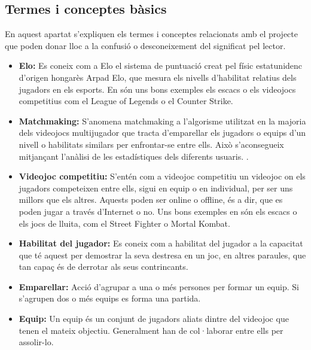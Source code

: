 \documentclass[a4paper]{article}
\begin{document}
\subsection{Termes i conceptes bàsics}
En aquest apartat s'expliquen els termes i conceptes relacionats amb el projecte que poden donar lloc a la confusió o desconeixement del significat pel lector.

\begin{itemize}
\item \textbf{Elo:} Es coneix com a Elo el sistema de puntuació creat pel físic estatunidenc d'origen hongarès Arpad Elo, que mesura els nivells d'habilitat relatius dels jugadors en els esports. En són uns bons exemples els escacs o els videojocs competitius com el League of Legends o el Counter Strike. \cite{wikipediaElo}

\item \textbf{Matchmaking:} S'anomena matchmaking a l'algorisme utilitzat en la majoria dels videojocs multijugador que tracta d'emparellar els jugadors o equips d'un nivell o habilitats similars per enfrontar-se entre ells. Això s'aconsegueix mitjançant l'anàlisi de les estadístiques dels diferents usuaris. \cite{matchmakingDef}.

\item \textbf{Videojoc competitiu:} S'entén com a videojoc competitiu un videojoc on els jugadors competeixen entre ells, sigui en equip o en individual, per ser uns millors que els altres. Aquests poden ser online o offline, és a dir, que es poden jugar a través d'Internet o no. Uns bons exemples en són els escacs o els jocs de lluita, com el Street Fighter o Mortal Kombat.

\item \textbf{Habilitat del jugador:} Es coneix com a habilitat del jugador a la capacitat que té aquest per demostrar la seva destresa en un joc, en altres paraules, que tan capaç és de derrotar als seus contrincants.

\item \textbf{Emparellar:} Acció d'agrupar a una o més persones per formar un equip. Si s'agrupen dos o més equips es forma una partida.

\item \textbf{Equip:} Un equip és un conjunt de jugadors aliats dintre del videojoc que tenen el mateix objectiu. Generalment han de col·laborar entre ells per assolir-lo.
\end{itemize}

\newpage
\end{document}
